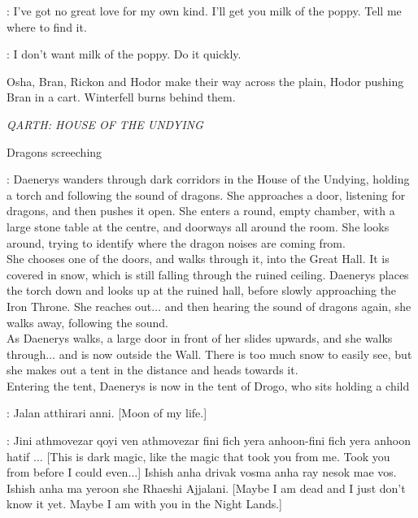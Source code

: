 \OSHA: I've got no great love for my own kind. I'll get you milk of the poppy. Tell me where to find it. 

\LUWIN: I don't want milk of the poppy.  Do it quickly. 


\n Osha, Bran, Rickon and Hodor make their way across the plain, Hodor pushing Bran in a cart. Winterfell burns behind them.


\scene

\textit{QARTH: HOUSE OF THE UNDYING} 

\sfx Dragons screeching


\NARRATOR: Daenerys wanders through dark corridors in the House of the Undying, holding a torch and following the sound of dragons. She approaches a door, listening for dragons, and then pushes it open. She enters a round, empty chamber, with a large stone table at the centre, and doorways all around the room. She looks around, trying to identify where the dragon noises are coming from.\\
She chooses one of the doors, and walks through it, into the Great Hall. It is covered in snow, which is still falling through the ruined ceiling. Daenerys places the torch down and looks up at the ruined hall, before slowly approaching the Iron Throne. She reaches out$\ldots$ and then hearing the sound of dragons again, she walks away, following the sound.\\
As Daenerys walks, a large door in front of her slides upwards, and she walks through$\ldots$ and is now outside the Wall. There is too much snow to easily see, but she makes out a tent in the distance and heads towards it.\\
Entering the tent, Daenerys is now in the tent of Drogo, who sits holding a child

\DROGO: Jalan atthirari anni. [Moon of my life.] 


\DAENERYS: Jini athmovezar qoyi ven athmovezar fini fich yera anhoon-fini fich yera anhoon hatif $\ldots$ [This is dark magic, like the magic that took you from me. Took you from before I could even$\ldots$] Ishish anha drivak vosma anha ray nesok mae vos. Ishish anha ma yeroon she Rhaeshi Ajjalani. [Maybe I am dead and I just don't know it yet. Maybe I am with you in the Night Lands.] 

